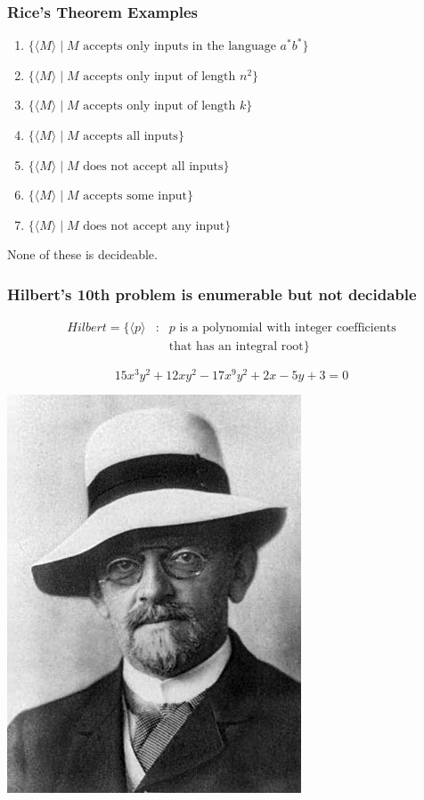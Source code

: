 \documentclass{beamer}
\newcommand{\bfr}[1]{\begin{frame}[fragile]\frametitle{{ #1 }}}
\begin{document}
\bfr{Rice's Theorem Examples}
\begin{enumerate}
  \item $\{\langle M\rangle\mid \mbox{$M$ accepts only inputs in the language $a^*b^*$}\}$
\item  $\{\langle M\rangle\mid \mbox{$M$ accepts only input of length $n^2$}\}$
\item  $\{\langle M\rangle\mid \mbox{$M$ accepts only input of length $k$}\}$
\item $\{\langle  M\rangle\mid \mbox{$M$ accepts all inputs}\}$
\item $\{\langle  M\rangle\mid \mbox{$M$ does not accept all inputs}\}$
\item $\{\langle  M\rangle\mid \mbox{$M$ accepts some input}\}$
\item $\{\langle  M\rangle\mid \mbox{$M$ does not accept any input}\}$
\end{enumerate}

None of these is decideable.

\end{frame}

\bfr{Hilbert's 10th problem is enumerable but not decidable}
\begin{eqnarray*}
Hilbert = \{\langle p \rangle &:& \mbox{$p$ is a polynomial with integer
  coefficients}\\ &&\mbox{that has an integral root}\}
\end{eqnarray*}

\vfill

\[
15x^3y^2 + 12xy^2 - 17x^9y^2 + 2x - 5y + 3 = 0
\]
\vfill

\hfill\includegraphics[scale=0.25]{Hilbert.jpg}
\end{frame}
\end{document}
